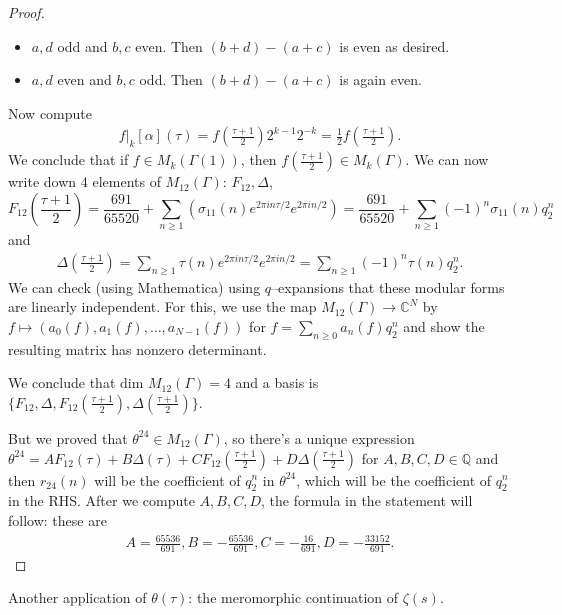 \documentclass{article}
\theoremstyle{definition}
\begin{document}
\begin{proof}
\begin{itemize}
        \item $a,d$ odd and $b,c$ even. Then $(b+d)-(a+c)$ is even as desired.
        \item $a,d$ even and $b,c$ odd. Then $(b+d)-(a+c)$ is again even.
    \end{itemize}
    Now compute 
    \begin{align*}
        f|_k[\alpha](\tau) = f \left(\frac{\tau+1}{2}\right) 2^{k-1} 2^{-k} = \frac{1}{2} f \left(\frac{\tau+1}{2}\right).
    \end{align*}
    We conclude that if $f \in M_k(\Gamma(1))$, then $f \left(\frac{\tau+1}{2}\right) \in M_k(\Gamma)$. We can now write down $4$ elements of $M_{12}(\Gamma)$: $F_{12}, \Delta$, $$F_{12}\left(\frac{\tau+1}{2}\right) = \frac{691}{65520} + \sum_{n\ge 1}^{} \left( \sigma_{11}(n)e^{2\pi i n \tau/2} e^{2 \pi i n/2}\right) = \frac{691}{65520} + \sum_{n\ge 1}^{} (-1)^n \sigma_{11}(n)q_2^n$$
    and \begin{align*}
        \Delta \left(\frac{\tau+1}{2}\right) = \sum_{n\ge 1}^{} \tau(n) e^{2\pi i n \tau/2} e^{2 \pi i n/2} = \sum_{n\ge 1}^{} (-1)^n \tau(n) q_2^n.
    \end{align*}
    We can check (using Mathematica) using $q$--expansions that these modular forms are linearly independent. For this, we use the map $M_{12}(\Gamma) \to \mathbb{C}^{N}$ by $f \mapsto (a_0(f), a_1(f), \ldots, a_{N-1}(f))$ for $f = \sum_{n\ge 0}^{} a_n(f)q_2^n$ and show the resulting matrix has nonzero determinant.
    \vspace{1mm}
     
    We conclude that $\text{dim }M_{12}(\Gamma) = 4$ and a basis is $\{F_{12},\Delta,F_{12}\left(\frac{\tau+1}{2}\right), \Delta \left(\frac{\tau+1}{2}\right)\}$.

    But we proved that $\theta^{24} \in M_{12}(\Gamma)$, so there's a unique expression $\theta^{24} = A F_{12}(\tau)+B \Delta(\tau) + C F_{12}\left(\frac{\tau+1}{2}\right) + D \Delta \left(\frac{\tau+1}{2}\right)$ for $A,B,C,D \in \mathbb{Q}$ and then $r_{24}(n)$ will be the coefficient of $q_2^n$ in $\theta^{24}$, which will be the coefficient of $q_2^n$ in the RHS. After we compute $A,B,C,D$, the formula in the statement will follow: these are \begin{align*}
        A = \frac{65536}{691}, B = -\frac{65536}{691}, C = - \frac{16}{691}, D = -\frac{33152}{691}.
    \end{align*}
\end{proof}
Another application of $\theta(\tau)$: the meromorphic continuation of $\zeta(s)$.
\end{document}
